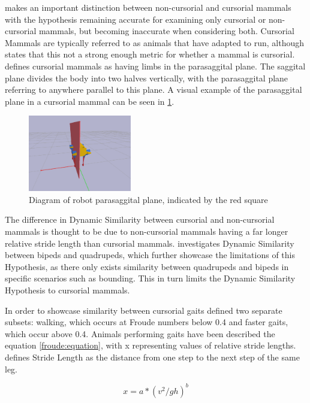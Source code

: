 \cite{Alexander1983} makes an important distinction between non-cursorial and cursorial mammals with the hypothesis remaining accurate for examining only cursorial or non-cursorial mammals, but becoming inaccurate when considering both. Cursorial Mammals are typically referred to as animals that have adapted to run, although \cite{Garland1993} states that this not a strong enough metric for whether a mammal is cursorial. \cite{Stein1997} defines cursorial mammals as having limbs in the parasaggital plane. The saggital plane divides the body into two halves vertically, with the parasaggital plane referring to anywhere parallel to this plane. A visual example of the parasaggital plane in a cursorial mammal can be seen in \ref{fig:parasaggital}. 
 
\begin{figure}
    \centering
    \includegraphics[width=0.4\textwidth]{figures/parasaggital.png}
    \caption{Diagram of robot parasaggital plane, indicated by the red square}
    \label{fig:parasaggital}
\end{figure}

The difference in Dynamic Similarity between cursorial and non-cursorial mammals is thought to be due to non-cursorial mammals having a far longer relative stride length than cursorial mammals. \cite{Gan2018a} investigates Dynamic Similarity between bipeds and quadrupeds, which further showcase the limitations of this Hypothesis, as there only exists similarity between quadrupeds and bipeds in  specific scenarios such as bounding. This in turn limits the Dynamic Similarity Hypothesis to cursorial mammals.


In order to showcase similarity between cursorial gaits \cite{Alexander1983} defined two separate subsets: walking, which occurs at Froude numbers below 0.4 and faster gaits, which occur above 0.4. Animals performing gaits have been described the equation \ref{froude:equation}, with x representing values of relative stride lengths. \cite{Carr2016} defines Stride Length as the distance from one step to the next step of the same leg. 

\begin{equation}
x = a*(v^2/gh)^b
\label{froude:equation}
\end{equation}

